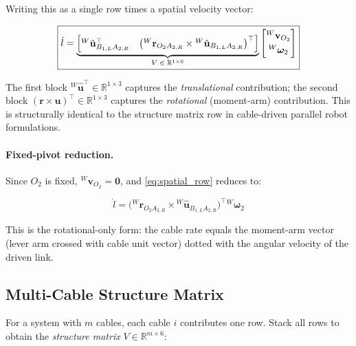 \documentclass[12pt, a4paper]{article}
\theoremstyle{definition}
\begin{document}
Writing this as a single row times a spatial velocity vector:

\begin{equation}
  \label{eq:spatial_row}
  \boxed{
  \dot{l}
  =
  \underbrace{%
    \begin{bmatrix}
      {}^{W}\hat{\mathbf{u}}_{B_{1,L}A_{2,R}}^\top &
      \bigl({}^{W}\mathbf{r}_{O_2 A_{2,R}}
            \times {}^{W}\hat{\mathbf{u}}_{B_{1,L}A_{2,R}}\bigr)^\top
    \end{bmatrix}
  }_{V \;\in\;\mathbb{R}^{1\times 6}}
  \begin{bmatrix}
    {}^{W}\mathbf{v}_{O_2} \\[3pt] {}^{W}\boldsymbol{\omega}_2
  \end{bmatrix}
  }
\end{equation}

The first block ${}^{W}\hat{\mathbf{u}}^\top \in \mathbb{R}^{1\times 3}$ captures the
\emph{translational} contribution; the second block
$(\mathbf{r}\times\mathbf{u})^\top \in \mathbb{R}^{1\times 3}$ captures the
\emph{rotational} (moment-arm) contribution.  This is structurally identical to the
structure matrix row in cable-driven parallel robot formulations.

\paragraph{Fixed-pivot reduction.}
Since $O_2$ is fixed, ${}^{W}\mathbf{v}_{O_2} = \mathbf{0}$, and \cref{eq:spatial_row}
reduces to:

\begin{equation}
  \label{eq:rot_only}
  \boxed{
  \dot{l}
  =
  \bigl({}^{W}\mathbf{r}_{O_2 A_{2,R}}
        \times {}^{W}\hat{\mathbf{u}}_{B_{1,L}A_{2,R}}\bigr)^\top
  {}^{W}\boldsymbol{\omega}_2
  }
\end{equation}

\noindent
This is the rotational-only form: the cable rate equals the moment-arm vector
(lever arm crossed with cable unit vector) dotted with the angular velocity of the
driven link.

\subsection{Multi-Cable Structure Matrix}
\label{sec:structure_matrix}

For a system with $m$ cables, each cable $i$ contributes one row.  Stack all rows
to obtain the \emph{structure matrix} $V \in \mathbb{R}^{m \times 6}$:
\end{document}
